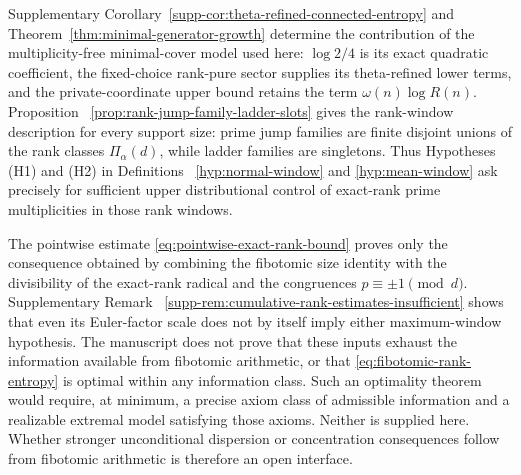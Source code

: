 \begin{remark}
\label{rem:exact-average-open-interface}
Supplementary Corollary~\ref{supp-cor:theta-refined-connected-entropy} and
Theorem~\ref{thm:minimal-generator-growth} determine the contribution of the
multiplicity-free minimal-cover model used here: $\log2/4$ is its exact
quadratic coefficient, the fixed-choice rank-pure sector supplies its
theta-refined lower terms, and the private-coordinate upper bound retains the
term $\omega(n)\log R(n)$. Proposition~
\ref{prop:rank-jump-family-ladder-slots} gives the rank-window description for
every support size:
prime jump families are finite disjoint unions of the rank
classes $\Pi_\alpha(d)$, while ladder families are singletons. Thus
Hypotheses \textup{(H1)} and \textup{(H2)} in Definitions~
\ref{hyp:normal-window} and \ref{hyp:mean-window} ask precisely for sufficient
upper distributional control of
exact-rank prime multiplicities in those rank windows.

The pointwise estimate \eqref{eq:pointwise-exact-rank-bound} proves only the
consequence obtained by combining the fibotomic size identity with the
divisibility of the exact-rank radical and the congruences
$p\equiv\pm1\pmod d$. Supplementary Remark~
\ref{supp-rem:cumulative-rank-estimates-insufficient} shows that even its
Euler-factor scale does not by itself imply either maximum-window hypothesis. The
manuscript does not prove that these inputs exhaust the information available
from fibotomic arithmetic, or that
\eqref{eq:fibotomic-rank-entropy} is optimal within any information class. Such
an optimality theorem would require, at minimum, a precise axiom class of
admissible information and a realizable extremal model satisfying those
axioms. Neither is supplied here. Whether stronger unconditional dispersion or
concentration consequences follow from fibotomic arithmetic is therefore an
open interface.


\end{remark}
